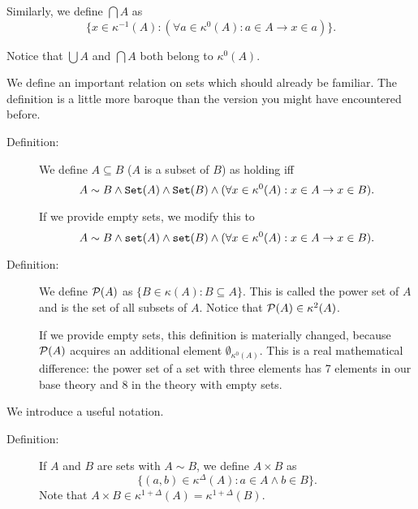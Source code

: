 \documentclass[12pt]{article}
\begin{document}
\begin{description}
Similarly, we define $\bigcap A$ as $$\{x \in \kappa^{-1}(A):(\forall a \in \kappa^0(A):a \in A \rightarrow x \in a)\}.$$

Notice that $\bigcup A$ and $\bigcap A$ both belong to $\kappa^0(A)$.

\end{description}

We define an important relation on sets which should already be familiar.  The definition is a little more baroque than the version you might have encountered before.

\begin{description}

\item[Definition:]  We define $A \subseteq B$ ($A$ is a subset of $B$) as holding iff $$A \sim B \wedge {\tt Set}(A) \wedge {\tt Set}(B)\wedge (\forall x \in \kappa^0(A):x \in A \rightarrow x \in B).$$

If we provide empty sets, we modify this to  $$A \sim B \wedge {\tt set}(A) \wedge {\tt set}(B)\wedge (\forall x \in \kappa^0(A):x \in A \rightarrow x \in B).$$

\item[Definition:]  We define ${\cal P}(A)$ as $\{B \in \kappa(A):B \subseteq A\}$.  This is called the power set of $A$ and is the set of all subsets of $A$.  Notice that ${\cal P}(A) \in \kappa^2(A)$.

If we provide empty sets, this definition is materially changed, because ${\cal P}(A)$ acquires an additional element $\emptyset_{\kappa^0(A)}$.  This is a real mathematical difference:  the power set of a set with three elements has 7 elements in our base theory and 8 in the theory with empty sets.

\end{description}

We introduce a useful notation.

\begin{description}

\item[Definition:]  If $A$ and $B$ are sets with $A \sim B$, we define $A \times B$ as $$\{(a,b) \in \kappa^{\Delta}(A):a \in A \wedge b \in B\}.$$  Note that $A \times B \in \kappa^{1+\Delta}(A) = \kappa^{1+\Delta}(B)$.

\end{description}

\newpage
\end{document}

